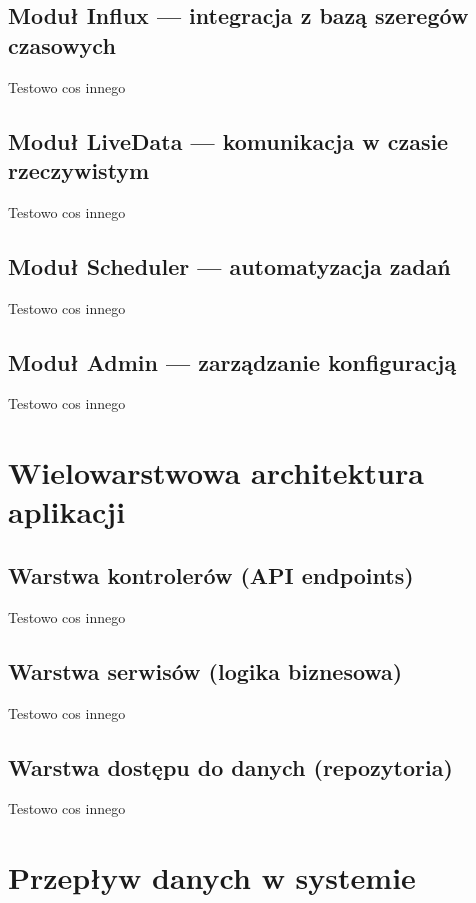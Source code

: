 \documentclass[a4paper,12pt,openany]{book}
\begin{document}
\subsection{Moduł Influx --- integracja z bazą szeregów czasowych}

Testowo cos innego

\subsection{Moduł LiveData --- komunikacja w czasie rzeczywistym}

Testowo cos innego

\subsection{Moduł Scheduler --- automatyzacja zadań}

Testowo cos innego

\subsection{Moduł Admin --- zarządzanie konfiguracją}

Testowo cos innego

\section{Wielowarstwowa architektura aplikacji}

\subsection{Warstwa kontrolerów (API endpoints)}

Testowo cos innego

\subsection{Warstwa serwisów (logika biznesowa)}

Testowo cos innego

\subsection{Warstwa dostępu do danych (repozytoria)}

Testowo cos innego

\section{Przepływ danych w systemie}
\end{document}
